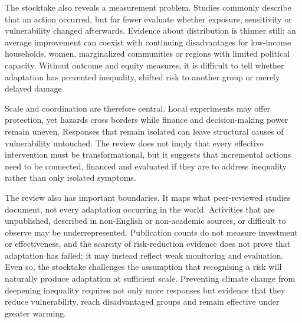 \documentclass[11pt,a4paper]{article}
\begin{document}
\begin{extractbox}
The stocktake also reveals a measurement problem. Studies commonly describe that an action occurred, but far fewer evaluate whether exposure, sensitivity or vulnerability changed afterwards. Evidence about distribution is thinner still: an average improvement can coexist with continuing disadvantages for low-income households, women, marginalized communities or regions with limited political capacity. Without outcome and equity measures, it is difficult to tell whether adaptation has prevented inequality, shifted risk to another group or merely delayed damage.

Scale and coordination are therefore central. Local experiments may offer protection, yet hazards cross borders while finance and decision-making power remain uneven. Responses that remain isolated can leave structural causes of vulnerability untouched. The review does not imply that every effective intervention must be transformational, but it suggests that incremental actions need to be connected, financed and evaluated if they are to address inequality rather than only isolated symptoms.

The review also has important boundaries. It maps what peer-reviewed studies document, not every adaptation occurring in the world. Activities that are unpublished, described in non-English or non-academic sources, or difficult to observe may be underrepresented. Publication counts do not measure investment or effectiveness, and the scarcity of risk-reduction evidence does not prove that adaptation has failed; it may instead reflect weak monitoring and evaluation. Even so, the stocktake challenges the assumption that recognising a risk will naturally produce adaptation at sufficient scale. Preventing climate change from deepening inequality requires not only more responses but evidence that they reduce vulnerability, reach disadvantaged groups and remain effective under greater warming.

\end{extractbox}
\end{document}
